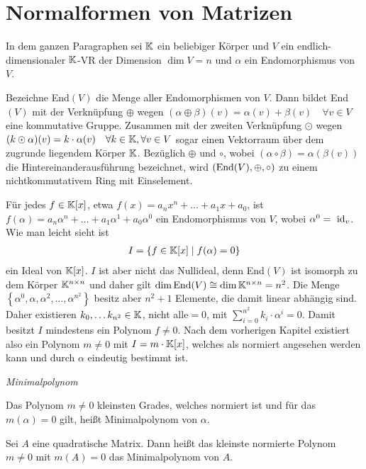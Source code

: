 \section{Normalformen von Matrizen}
In dem ganzen Paragraphen sei $\mathbb{K}$ ein beliebiger Körper und $V$ ein endlich-dimensionaler $\mathbb{K}$-VR der Dimension $\dim V=n$ und $\alpha$ ein Endomorphismus von $V$.\par\medskip

Bezeichne End$(V)$ die Menge aller Endomorphismen von $V$.
Dann bildet End$(V)$ mit der Verknüpfung $\oplus$ wegen $(\alpha \oplus \beta) (v) = \alpha(v) + \beta(v) \quad \forall v\in V$ eine kommutative Gruppe.
Zusammen mit der zweiten Verknüpfung $\odot$ wegen $(k \odot \alpha)(v) = k\cdot \alpha(v) \quad \forall k\in \mathbb{K}, \forall v\in V$ sogar einen Vektorraum über dem zugrunde liegendem Körper $\mathbb{K}$.
Bezüglich $\oplus$ und $\circ$, wobei $(\alpha \circ \beta) = \alpha(\beta(v))$ die Hintereinanderausführung bezeichnet, wird $\left(\text{End}(V),\oplus,\circ\right)$ zu einem nichtkommutativem Ring mit Einselement.\par\medskip

Für jedes $f \in \mathbb{K}[x]$, etwa $f(x) = a_n x^n + \ldots + a_1 x + a_0$, ist $f(\alpha) = a_n \alpha^n + \ldots + a_1 \alpha^1 + a_0 \alpha^0$ ein Endomorphismus von $V$, wobei $\alpha^0 = \mbox{ id}_v$.
Wie man leicht sieht ist 
\begin{align*}
    I = \left\{  f\in \mathbb{K}[x] \mid f(\alpha) = 0 \right\}
\end{align*}
ein Ideal von $\mathbb{K}[x]$. $I$ ist aber nicht das Nullideal, denn End$(V)$ ist isomorph zu dem Körper $\mathbb{K}^{n \times n}$ und daher gilt $\dim\text{End}(V) \cong \dim\mathbb{K}^{n \times n} = n^2$.
Die Menge $\left\{ \alpha^0, \alpha, \alpha^2, \ldots, \alpha^{n^2}\right\}$ besitz aber $n^2+1$ Elemente, die damit linear abhängig sind.
Daher existieren $k_0, \ldots k_{n^2} \in \mathbb{K}$, nicht alle$= 0$, mit $\sum\limits_{i=0}^{n^2} k_i \cdot \alpha^i = 0$.
Damit besitzt $I$ mindestens ein Polynom $f \neq 0$.
Nach dem vorherigen Kapitel existiert also ein Polynom $m \neq 0$ mit $I = m \cdot \mathbb{K}[x]$, welches als normiert angesehen werden kann und durch $\alpha$ eindeutig bestimmt ist.


\begin{mydef}\label{minpoly}\textit{Minimalpolynom}

    Das Polynom $m \neq 0$ kleinsten Grades, welches normiert ist und für das $m(\alpha) = 0$ gilt, heißt Minimalpolynom von $\alpha$.

    Sei $A$ eine quadratische Matrix. Dann heißt das kleinste normierte Polynom $m \neq 0$ mit $m(A) = 0$ das Minimalpolynom von $A$.
\end{mydef}

